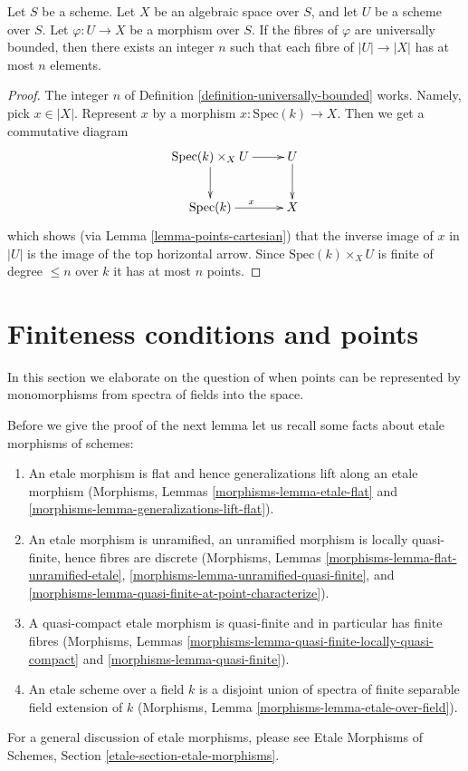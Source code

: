 \begin{lemma}
\label{lemma-universally-bounded-finite-fibres}
Let $S$ be a scheme.
Let $X$ be an algebraic space over $S$, and let $U$ be a scheme over $S$.
Let $\varphi : U \to X$ be a morphism over $S$.
If the fibres of $\varphi$ are universally bounded, then there exists an
integer $n$ such that each fibre of $|U| \to |X|$ has at most
$n$ elements.
\end{lemma}

\begin{proof}
The integer $n$ of Definition \ref{definition-universally-bounded} works.
Namely, pick $x \in |X|$. Represent $x$ by a morphism
$x : \text{Spec}(k) \to X$. Then we get a commutative diagram
$$
\xymatrix{
\text{Spec}(k) \times_X U \ar[r] \ar[d] & U \ar[d] \\
\text{Spec}(k) \ar[r]^x & X
}
$$
which shows (via Lemma \ref{lemma-points-cartesian})
that the inverse image of $x$ in $|U|$ is the image of
the top horizontal arrow. Since $\text{Spec}(k) \times_X U$ is finite
of degree $\leq n$ over $k$ it has at most $n$ points.
\end{proof}








\section{Finiteness conditions and points}
\label{section-points-monomorphisms}

\noindent
In this section we elaborate on the question of when points can be represented
by monomorphisms from spectra of fields into the space.

\begin{remark}
\label{remark-recall}
Before we give the proof of the next lemma let us recall some facts
about etale morphisms of schemes:
\begin{enumerate}
\item An etale morphism is flat and hence generalizations lift along
an etale morphism
(Morphisms, Lemmas \ref{morphisms-lemma-etale-flat}
and \ref{morphisms-lemma-generalizations-lift-flat}).
\item An etale morphism is unramified, an unramified morphism is locally
quasi-finite, hence fibres are discrete
(Morphisms, Lemmas \ref{morphisms-lemma-flat-unramified-etale},
\ref{morphisms-lemma-unramified-quasi-finite}, and
\ref{morphisms-lemma-quasi-finite-at-point-characterize}).
\item A quasi-compact etale morphism is quasi-finite and in particular
has finite fibres
(Morphisms, Lemmas \ref{morphisms-lemma-quasi-finite-locally-quasi-compact} and
\ref{morphisms-lemma-quasi-finite}).
\item An etale scheme over a field $k$ is a disjoint union of spectra
of finite separable field extension of $k$
(Morphisms, Lemma \ref{morphisms-lemma-etale-over-field}).
\end{enumerate}
For a general discussion of etale morphisms, please see
Etale Morphisms of Schemes, Section \ref{etale-section-etale-morphisms}.
\end{remark}

